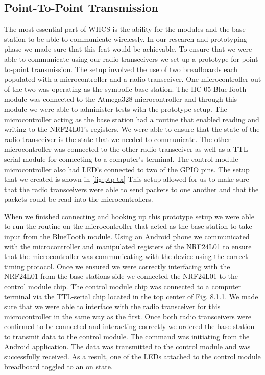 \subsection{Point-To-Point Transmission}
The most essential part of WHCS is the ability for the modules and the base
station to be able to communicate wirelessly. In our research and prototyping
phase we made sure that this feat would be achievable. To ensure that we were
able to communicate using our radio transceivers we set up a prototype for
point{}-to{}-point transmission. The setup involved the use of two breadboards
each populated with a microcontroller and a radio transceiver. One
microcontroller out of the two was operating as the symbolic base station. The
HC{}-05 BlueTooth module was connected to the Atmega328 microcontroller and
through this module we were able to administer tests with the prototype setup.
The microcontroller acting as the base station had a routine that enabled
reading and writing to the NRF24L01's registers.  We were able to ensure that
the state of the radio transceiver is the state that we needed to communicate.
The other microcontroller was connected to the other radio transceiver as well
as a TTL{}-serial module for connecting to a computer{}'s terminal. The control
module microcontroller also had LED{}'s connected to two of the GPIO pins. The
setup that we created is shown in \autoref{fig:ptp-tx} This setup allowed for
us to make sure that the radio transceivers were able to send packets to one
another and that the packets could be read into the microcontrollers.


When we finished connecting and hooking up this prototype setup
we were able to run the routine on the microcontroller that acted as the base
station to take input from the BlueTooth module. Using an Android phone we
communicated with the microcontroller and manipulated registers of the NRF24L01
to ensure that the microcontroller was communicating with the device using the
correct timing protocol. Once we ensured we were correctly interfacing with the
NRF24L01 from the base stations side we connected the NRF24L01 to the control
module chip. The control module chip was connected to a computer terminal via
the TTL{}-serial chip located in the top center of Fig. 8.1.1. We made sure
that we were able to interface with the radio transceiver for this
microcontroller in the same way as the first. Once both radio transceivers were
confirmed to be connected and interacting correctly we ordered the base station
to transmit data to the control module.  The command was initiating from the
Android application. The data was transmitted to the control module and was
successfully received. As a result, one of the LEDs attached to the control
module breadboard toggled to an on state.

